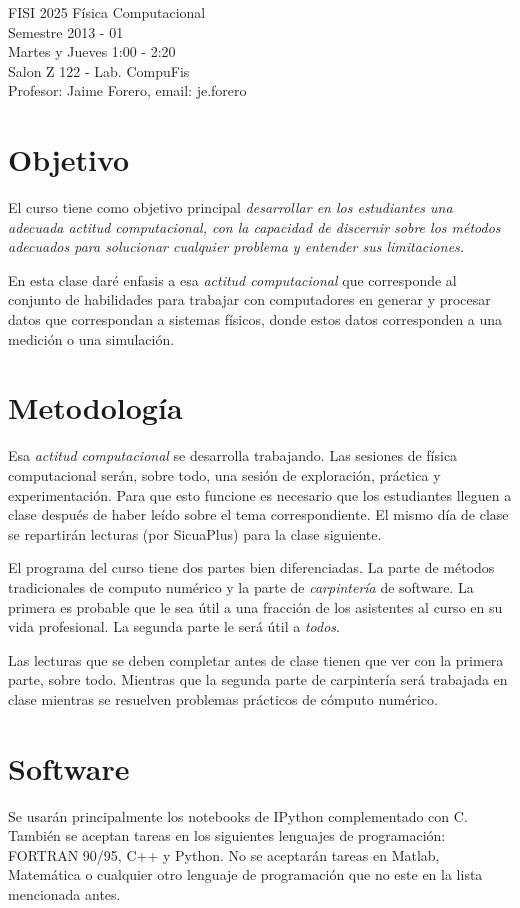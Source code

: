 \documentclass[12pt]{article}
\begin{document}
\noindent
FISI 2025 F\'isica Computacional \\
Semestre 2013 - 01\\
Martes y Jueves 1:00 - 2:20 \\
Salon Z 122 - Lab. CompuFis\\
Profesor: Jaime Forero, email: je.forero\\


\section*{Objetivo}
El curso tiene como objetivo principal \emph{desarrollar en los estudiantes una adecuada actitud computacional, con la capacidad de discernir sobre los m\'etodos adecuados para solucionar cualquier problema y entender sus limitaciones.}

En esta clase dar\'e enfasis a esa \emph{actitud computacional} que corresponde al conjunto de habilidades para trabajar con computadores en generar y procesar datos que correspondan a sistemas f\'isicos, donde estos datos corresponden a una medici\'on o una simulaci\'on.

\section*{Metodolog\'ia}
Esa \emph{actitud computacional} se desarrolla trabajando. Las sesiones de f\'isica computacional ser\'an, sobre todo, una sesi\'on de exploraci\'on, pr\'actica y experimentaci\'on. Para que esto funcione es necesario que los estudiantes lleguen a clase despu\'es de haber le\'ido sobre el tema correspondiente. El mismo d\'ia de clase se repartir\'an lecturas (por SicuaPlus) para la clase siguiente.

El programa del curso tiene dos partes bien diferenciadas. La parte de m\'etodos tradicionales de computo num\'erico y la parte de \emph{carpinter\'ia} de software. La primera es probable que le sea \'util a una fracci\'on de los asistentes al curso en su vida profesional. La segunda parte le ser\'a \'util a \emph{todos}.

Las lecturas que se deben completar antes de clase tienen que ver con la primera parte, sobre todo. Mientras que la segunda parte de carpinter\'ia ser\'a trabajada en clase mientras se resuelven problemas pr\'acticos de c\'omputo num\'erico.

\section*{Software}
\noindent Se usar\'an principalmente los notebooks de IPython complementado con C. Tambi\'en se aceptan tareas en los siguientes lenguajes de programaci\'on: FORTRAN 90/95, C++ y Python. No se aceptar\'an tareas en Matlab, Matem\'atica o cualquier otro lenguaje de programaci\'on que no este en la lista mencionada antes. 
\end{document}
